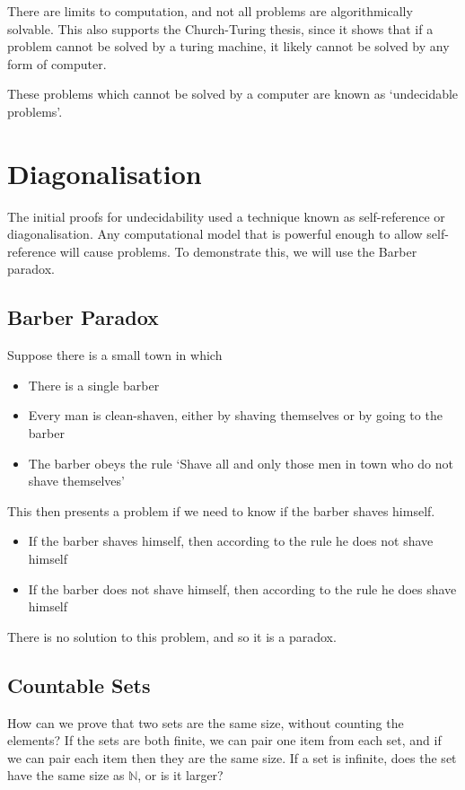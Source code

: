 
There are limits to computation, and not all problems are algorithmically solvable. This also supports the Church-Turing
 thesis, since it shows that if a problem cannot be solved by a turing machine, it likely cannot be solved by any form
 of computer.

These problems which cannot be solved by a computer are known as `undecidable problems'.

\section*{Diagonalisation}

The initial proofs for undecidability used a technique known as self-reference or diagonalisation. Any computational
 model that is powerful enough to allow self-reference will cause problems. To demonstrate this, we will use the Barber
 paradox.

\subsection*{Barber Paradox}

Suppose there is a small town in which
\begin{itemize}
  \item There is a single barber
  \item Every man is clean-shaven, either by shaving themselves or by going to the barber
  \item The barber obeys the rule `Shave all and only those men in town who do not shave themselves'
\end{itemize}
This then presents a problem if we need to know if the barber shaves himself.
\begin{itemize}
  \item If the barber shaves himself, then according to the rule he does not shave himself
  \item If the barber does not shave himself, then according to the rule he does shave himself
\end{itemize}
There is no solution to this problem, and so it is a paradox.

\subsection*{Countable Sets}

How can we prove that two sets are the same size, without counting the elements? If the sets are both finite, we can
 pair one item from each set, and if we can pair each item then they are the same size. If a set is infinite, does the
 set have the same size as $\mathbb{N}$, or is it larger?

